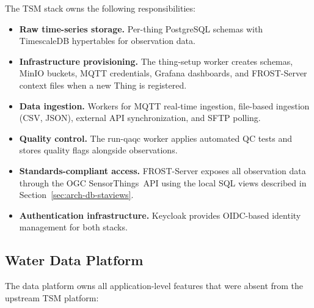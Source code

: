 The TSM stack owns the following responsibilities:

\begin{itemize}
  \item \textbf{Raw time-series storage.} Per-thing PostgreSQL schemas with TimescaleDB
        hypertables for observation data.
  \item \textbf{Infrastructure provisioning.} The thing-setup worker creates schemas,
        MinIO buckets, MQTT credentials, Grafana dashboards, and FROST-Server context
        files when a new Thing is registered.
  \item \textbf{Data ingestion.} Workers for MQTT real-time ingestion, file-based
        ingestion (CSV, JSON), external API synchronization, and SFTP polling.
  \item \textbf{Quality control.} The run-qaqc worker applies automated QC tests and
        stores quality flags alongside observations.
  \item \textbf{Standards-compliant access.} FROST-Server exposes all observation data
        through the OGC SensorThings~API using the local SQL views described in
        Section~\ref{sec:arch-db-staviews}.
  \item \textbf{Authentication infrastructure.} Keycloak provides OIDC-based identity
        management for both stacks.
\end{itemize}

\subsection{Water Data Platform}
\label{sec:arch-components-waterdp}

The data platform owns all application-level features that were absent from the upstream
TSM platform:

